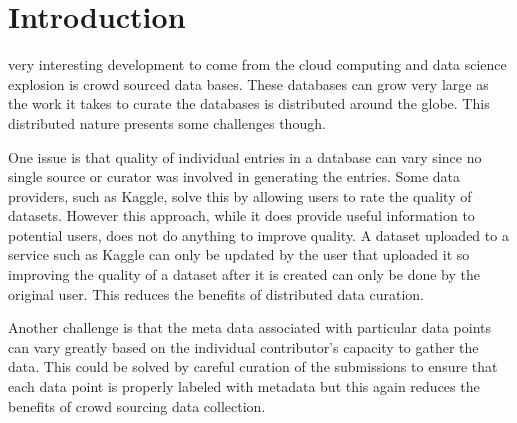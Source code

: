 \documentclass[conference,twoside]{IEEEtran}
\begin{document}
\section{Introduction}
%
%
%
%
 very interesting development to come from the cloud computing and data science explosion is crowd sourced data bases. These databases can grow very large as the work it takes to curate the databases is distributed around the globe. This distributed nature presents some challenges though.

One issue is that quality of individual entries in a database can vary since no single source or curator was involved in generating the entries. Some data providers, such as Kaggle\cite{kaggle}, solve this by allowing users to rate the quality of datasets. However this approach, while it does provide useful information to potential users, does not do anything to improve quality. A dataset uploaded to a service such as Kaggle can only be updated by the user that uploaded it so improving the quality of a dataset after it is created can only be done by the original user. This reduces the benefits of distributed data curation.

Another challenge is that the meta data associated with particular data points can vary greatly based on the individual contributor's capacity to gather the data. This could be solved by careful curation of the submissions to ensure that each data point is properly labeled with metadata but this again reduces the benefits of crowd sourcing data collection.
\end{document}
